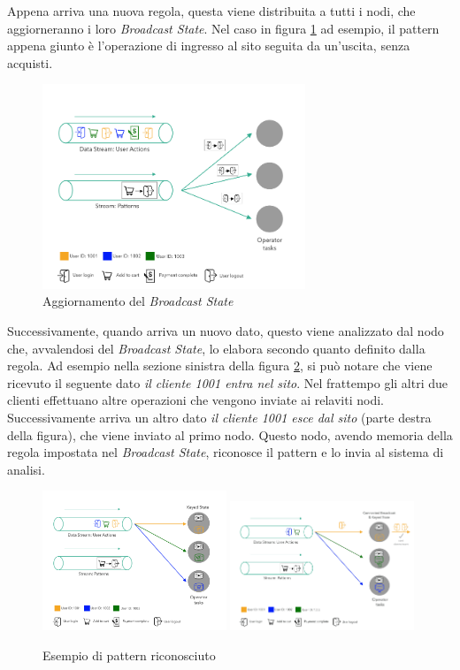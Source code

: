 Appena arriva una nuova regola, questa viene distribuita a tutti i nodi, che aggiorneranno i loro \textit{Broadcast State}.
Nel caso in figura \ref{fig:broadcastState2} ad esempio, il pattern appena giunto è l'operazione di ingresso al sito seguita da un'uscita, senza acquisti.
\begin{figure}[H]
    \centering
    \includegraphics[width=0.7\textwidth]{images/EventExport/broadcastState2.png}
    \caption{Aggiornamento del \textit{Broadcast State}}
    \label{fig:broadcastState2}
\end{figure}
Successivamente, quando arriva un nuovo dato, questo viene analizzato dal nodo che, avvalendosi del \textit{Broadcast State}, lo elabora secondo quanto definito dalla regola.
Ad esempio nella sezione sinistra della figura \ref{fig:broadcastState3/4}, si può notare che viene ricevuto il seguente dato \textit{il cliente 1001 entra nel sito}.
Nel frattempo gli altri due clienti effettuano altre operazioni che vengono inviate ai relaviti nodi.
Successivamente arriva un altro dato \textit{il cliente 1001 esce dal sito} (parte destra della figura), che viene inviato al primo nodo.
Questo nodo, avendo memoria della regola impostata nel \textit{Broadcast State}, riconosce il pattern e lo invia al sistema di analisi.
\begin{figure}[H]
    \centering
    \includegraphics[width=0.49\textwidth]{images/EventExport/broadcastState3.png}
    \includegraphics[width=0.49\textwidth]{images/EventExport/broadcastState4.png}
    \caption{Esempio di pattern riconosciuto}
    \label{fig:broadcastState3/4}
\end{figure}

